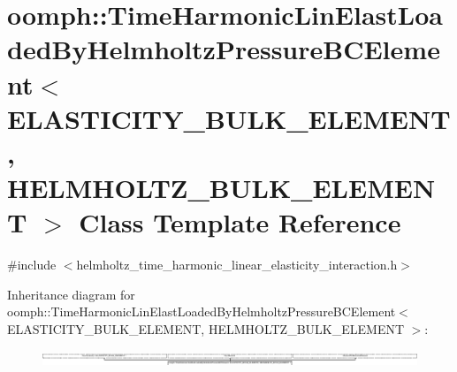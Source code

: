 \hypertarget{classoomph_1_1TimeHarmonicLinElastLoadedByHelmholtzPressureBCElement}{}\section{oomph\+:\+:Time\+Harmonic\+Lin\+Elast\+Loaded\+By\+Helmholtz\+Pressure\+B\+C\+Element$<$ E\+L\+A\+S\+T\+I\+C\+I\+T\+Y\+\_\+\+B\+U\+L\+K\+\_\+\+E\+L\+E\+M\+E\+NT, H\+E\+L\+M\+H\+O\+L\+T\+Z\+\_\+\+B\+U\+L\+K\+\_\+\+E\+L\+E\+M\+E\+NT $>$ Class Template Reference}
\label{classoomph_1_1TimeHarmonicLinElastLoadedByHelmholtzPressureBCElement}


{\ttfamily \#include $<$helmholtz\+\_\+time\+\_\+harmonic\+\_\+linear\+\_\+elasticity\+\_\+interaction.\+h$>$}

Inheritance diagram for oomph\+:\+:Time\+Harmonic\+Lin\+Elast\+Loaded\+By\+Helmholtz\+Pressure\+B\+C\+Element$<$ E\+L\+A\+S\+T\+I\+C\+I\+T\+Y\+\_\+\+B\+U\+L\+K\+\_\+\+E\+L\+E\+M\+E\+NT, H\+E\+L\+M\+H\+O\+L\+T\+Z\+\_\+\+B\+U\+L\+K\+\_\+\+E\+L\+E\+M\+E\+NT $>$\+:\begin{figure}[H]
\begin{center}
\leavevmode
\includegraphics[height=0.469012cm]{classoomph_1_1TimeHarmonicLinElastLoadedByHelmholtzPressureBCElement}
\end{center}
\end{figure}
